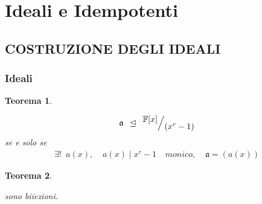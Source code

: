 \documentclass[mathserif]{beamer}
\def\quotient#1#2{%
   \raise1ex\hbox{$#1$}\Big/\lower1ex\hbox{$#2$}%
}
\newtheorem{teorema}{Teorema}
\begin{document}
\section{Ideali e Idempotenti}
\subsection{COSTRUZIONE DEGLI IDEALI}
\begin{frame}
  \frametitle{Ideali}
   \begin{teorema}
   \begin{center}
      \begin{align*}
	  \mathfrak{a}\phantom{a} \unlhd \phantom{a} \quotient{\mathbb{F} \lbrack x \rbrack  }{ (x^{r} - 1)} \\ 
	  \end{align*}
	  se e solo se
	  \begin{align*}
	      \exists ! \phantom{a}  a(x),   \phantom{aa} 
	      a(x) \mid x^r - 1 \phantom{aa} monico, \phantom{aa} \mathfrak{a} = (a(x))
	\end{align*}
   \end{center}	
   \end{teorema}   
\end{frame}

\begin{frame}
   \begin{teorema}
   \begin{center}
   \end{center}
   sono biiezioni.	
   \end{teorema}   
\end{frame}
\end{document}
